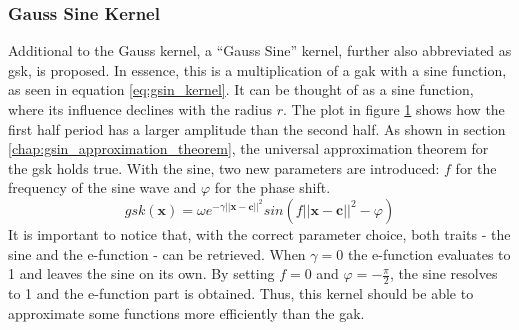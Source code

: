\documentclass[./\jobname.tex]{subfiles}
\begin{document}
\subsubsection{Gauss Sine Kernel}
\label{chap:gsin_kernel}
Additional to the Gauss kernel, a ``Gauss Sine'' kernel, further also abbreviated as \gls{gsk}, is proposed. In essence, this is a multiplication of a \gls{gak} with a sine function, as seen in equation \eqref{eq:gsin_kernel}. It can be thought of as a sine function, where its influence declines with the radius $r$. The plot in figure \ref{fig:gsin_kernel_3d_plot} shows how the first half period has a larger amplitude than the second half. As shown in section \ref{chap:gsin_approximation_theorem}, the universal approximation theorem for the \gls{gsk} holds true. With the sine, two new parameters are introduced: $f$ for the frequency of the sine wave and $\varphi$ for the phase shift. 
\begin{equation}
\label{eq:gsin_kernel}
gsk(\mathbf{x}) = \omega e^{-\gamma ||\mathbf{x} - \mathbf{c}||^2} sin(f ||\mathbf{x} - \mathbf{c}||^2 - \varphi)
\end{equation}
It is important to notice that, with the correct parameter choice, both traits - the sine and the e-function - can be retrieved. When $\gamma=0$ the e-function evaluates to 1 and leaves the sine on its own. By setting $f=0$ and $\varphi=-\frac{\pi}{2}$, the sine resolves to 1 and the e-function part is obtained. Thus, this kernel should be able to approximate some functions more efficiently than the \gls{gak}. 
\begin{figure}[h]
	\centering
	\noindent{}
	\label{fig:gsin_kernel_3d_plot}
\end{figure}
\end{document}
